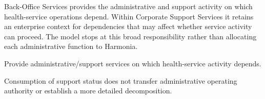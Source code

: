 Back-Office Services provides the administrative and support activity on which health-service operations depend. Within Corporate Support Services it retains an enterprise context for dependencies that may affect whether service activity can proceed. The model stops at this broad responsibility rather than allocating each administrative function to Harmonia.



Provide administrative/\allowbreak{}support services on which health-service activity depends.



Consumption of support status does not transfer administrative operating authority or establish a more detailed decomposition.


